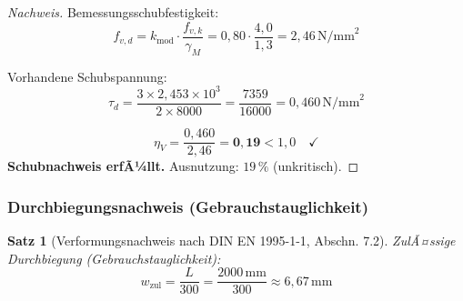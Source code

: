 ﻿\documentclass[12pt,a4paper]{article}
\theoremstyle{definition}
\theoremstyle{plain}
\newtheorem{theorem}{Satz}
\theoremstyle{remark}
\begin{document}
\begin{proof}[Nachweis]
Bemessungsschubfestigkeit:
\begin{equation*}
  f_{v,d} = k_{\text{mod}} \cdot \frac{f_{v,k}}{\gamma_M}
          = 0{,}80 \cdot \frac{4{,}0}{1{,}3} = 2{,}46\,\text{N/mm}^2
\end{equation*}

Vorhandene Schubspannung:
\begin{equation*}
  \tau_d = \frac{3 \times 2{,}453 \times 10^3}{2 \times 8000}
         = \frac{7359}{16000} = 0{,}460\,\text{N/mm}^2
\end{equation*}

\begin{equation*}
  \eta_V = \frac{0{,}460}{2{,}46} = \mathbf{0{,}19} < 1{,}0 \quad \checkmark
\end{equation*}
\textbf{Schubnachweis erfÃ¼llt.} Ausnutzung: $19\,\%$ (unkritisch).
\end{proof}

\subsubsection{Durchbiegungsnachweis (Gebrauchstauglichkeit)}

\begin{theorem}[Verformungsnachweis nach DIN EN 1995-1-1, Abschn. 7.2]
ZulÃ¤ssige Durchbiegung (Gebrauchstauglichkeit):
\begin{equation}
  w_{\text{zul}} = \frac{L}{300} = \frac{2000\,\text{mm}}{300} \approx 6{,}67\,\text{mm}
\end{equation}
\end{theorem}
\end{document}
